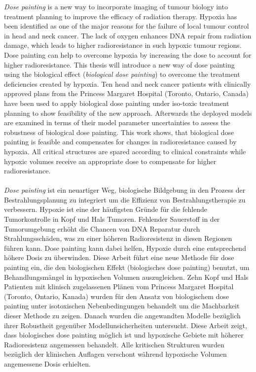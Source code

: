 
\textit{Dose painting} is a new way to incorporate imaging of tumour biology into treatment planning to improve the efficacy of radiation therapy.  Hypoxia has been identified as one of the major reasons for the failure of local tumour control in head and neck cancer. The lack of oxygen enhances DNA repair from radiation damage, which leads to higher radioresistance in such hypoxic tumour regions. Dose painting can help to overcome hypoxia by increasing the dose to account for higher radioresistance. This thesis will introduce a new way of dose painting using the biological effect (\textit{biological dose painting}) to overcome the treatment deficiencies created by hypoxia. Ten head and neck cancer patients with clinically approved plans from the Princess Margaret Hospital (Toronto, Ontario, Canada) have been used to apply biological dose painting under iso-toxic treatment planning to show feasibility of the new approach. Afterwards the deployed models are examined in terms of their model parameter uncertainties to assess the robustness of biological dose painting. This work shows, that biological dose painting is feasible and compensates for changes in radioresistance caused by hypoxia. All critical structures are spared according to clinical constraints while hypoxic volumes receive an appropriate dose to compensate for higher radioresistance.\\\\\textit{Dose painting} ist ein neuartiger Weg, biologische Bildgebung in den Prozess der Bestrahlungsplanung zu integriert um die Effizienz von Bestrahlungstherapie zu verbessern. Hypoxie ist eine der h\"aufigsten Gr\"unde f\"ur die fehlende Tumorkontrolle in Kopf und Hals Tumoren. Fehlender Sauerstoff in der Tumorumgebung erh\"oht die Chancen von DNA Reparatur durch Strahlungssch\"aden, was zu einer h\"oheren Radioresistenz in diesen Regionen f\"uhren kann. Dose painting kann dabei helfen, Hypoxie durch eine entsprechend h\"ohere Dosis zu \"uberwinden. Diese Arbeit f\"uhrt eine neue Methode f\"ur dose painting ein, die den biologischen Effekt (biologisches dose painting) benutzt, um Behandlungsm\"angel in hypoxischen Volumen auszugleichen. Zehn Kopf und Hals Patienten mit klinisch zugelassenen Pl\"anen vom Princess Margaret Hospital (Toronto, Ontario, Kanada) wurden f\"ur den Ansatz von biologischem dose painting unter isotoxischen Nebenbedingungen behandelt um die Machbarkeit dieser Methode zu zeigen. Danach wurden die angewandten Modelle bez\"uglich ihrer Robustheit gegen\"uber Modellunsicherheiten untersucht. Diese Arbeit zeigt, dass biologisches dose painting m\"oglich ist und hypoxische Gebiete mit h\"oherer Radioresistenz angemessen behandelt. Alle kritischen Strukturen wurden bez\"uglich der klinischen Auflagen verschont w\"ahrend hypoxische Volumen angemessene Dosis erhielten.
